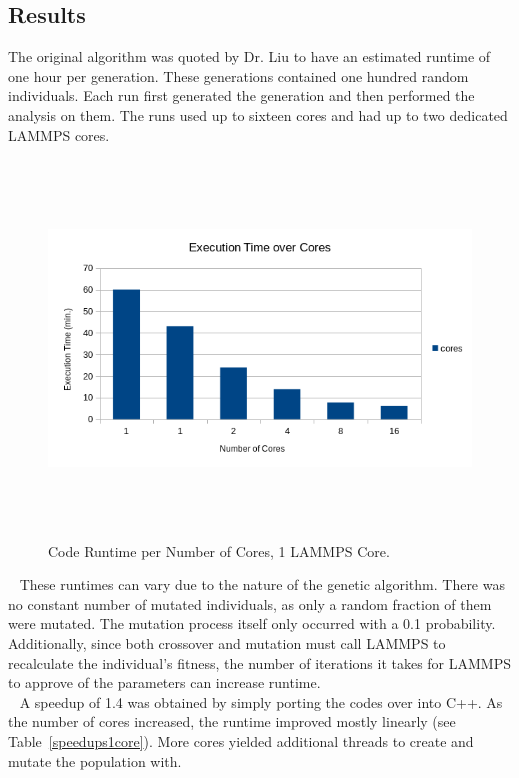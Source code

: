 \documentclass[letterpaper, 12pt]{article}
\begin{document}
\begin{flushleft}
\newpage
\section*{Results}
The original algorithm was quoted by Dr. Liu to have an estimated runtime of one hour per generation.  These generations contained one hundred random individuals.  Each run first generated the generation and then performed the analysis on them.  The runs used up to sixteen cores and had up to two dedicated LAMMPS cores.

\begin{figure}[H]
	\includegraphics[width=\linewidth,height=10cm,keepaspectratio]{results.png}
	\caption[Run Times per Core]{Code Runtime per Number of Cores, 1 LAMMPS Core.}
	\label{fig:runtimes1core}
\end{figure}

~\newline
These runtimes can vary due to the nature of the genetic algorithm.  There was no constant number of mutated individuals, as only a random fraction of them were mutated.  The mutation process itself only occurred with a 0.1 probability.  Additionally, since both crossover and mutation must call LAMMPS to recalculate the individual's fitness, the number of iterations it takes for LAMMPS to approve of the parameters can increase runtime. \\

~\newline
A speedup of 1.4 was obtained by simply porting the codes over into C++.  As the number of cores increased, the runtime improved mostly linearly (see Table~\ref{speedups1core}).  More cores yielded additional threads to create and mutate the population with.  


\end{flushleft}
\end{document}
